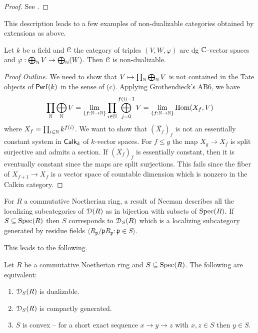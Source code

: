 \begin{proof}
    See \cite[Rmk. A.3.13]{HermetianII}. 
\end{proof}
This description leads to a few examples of non-dualizable categories obtained by extensions as above. 
\begin{proposition}
    Let $k$ be a field and $\EuScript{C}$ the category of triples $(V,W,\varphi)$ are dg $\mathbb{C}$-vector spaces and $\varphi:\bigoplus_{\mathbb{N}}V\to\bigoplus_{\mathbb{N}}(W)$. Then $\EuScript{C}$ is non-dualizable. 
\end{proposition}
\begin{proof}[Proof Outline]
    We need to show that $V\mapsto\prod_{\mathbb{N}}\bigoplus_{\mathbb{N}}V$ is not contained in the Tate objects of $\mathsf{Perf}(k)$ in the sense of  (c). Applying Grothendieck's AB6, we have 
    $$\prod_{\mathbb{N}}\bigoplus_{\mathbb{N}}V=\lim_{\{f:\mathbb{N}\to\mathbb{N}\}}\prod_{i\in \mathbb{N}}\bigoplus_{j=0}^{f(i)-1}V=\lim_{\{f:\mathbb{N}\to\mathbb{N}\}}\mathrm{Hom}(X_{f},V)$$
    where $X_{f}=\prod_{i\in\mathbb{N}}k^{f(i)}$. We want to show that $(\overline{X_{f}})_{f}$ is not an essentially constant system in $\mathsf{Calk}_{k}$ of $k$-vector spaces. For $f\leq g$ the map $X_{g}\to X_{f}$ is split surjective and admits a section. If $(\overline{X_{f}})_{f}$ is essentially constant, then it is eventually constant since the maps are split surjections. This fails since the fiber of $X_{f+1}\to X_{f}$ is a vector space of countable dimension which is nonzero in the Calkin category. 
\end{proof}

For $R$ a commutative Noetherian ring, a result of Neeman describes all the localizing subcategories of $\EuScript{D}(R)$ as in bijection with subsets of $\operatorname{Spec}(R)$. If $S\subseteq\operatorname{Spec}(R)$ then $S$ corresponds to $\EuScript{D}_{S}(R)$ which is a localizing subcategory generated by residue fields $\langle R_{\mathfrak{p}}/\mathfrak{p} R_{\mathfrak{p}}: \mathfrak{p}\in S\rangle$. 

This leads to the following. 
\begin{theorem}
    Let $R$ be a commutative Noetherian ring and $S\subseteq\operatorname{Spec}(R)$. The following are equivalent:
    \begin{enumerate}[label=(\alph*)]
        \item $\EuScript{D}_{S}(R)$ is dualizable. 
        \item $\EuScript{D}_{S}(R)$ is compactly generated. 
        \item $S$ is convex -- for a short exact sequence $x\to y\to z$ with $x,z\in S$ then $y\in S$. 
    \end{enumerate}
\end{theorem}